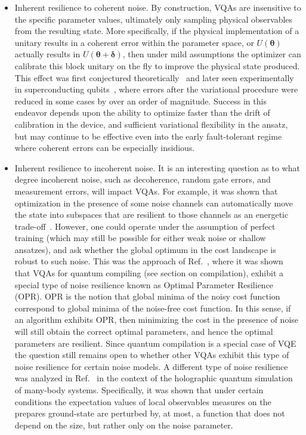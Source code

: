 \documentclass[prx,twocolumn,floatfix,superscriptaddress,longbibliography]{revtex4-1}
\renewcommand{\vec}[1]{\boldsymbol{#1}}  %
\newcommand{\<}{\langle}
\renewcommand{\>}{\rangle}
\renewcommand{\vec}[1]{\boldsymbol{#1}}  %
\begin{document}
\begin{itemize}
 \item{Inherent resilience to coherent noise.}  By construction, VQAs are insensitive to the specific parameter values, ultimately only sampling physical observables from the resulting state.  More specifically, if the physical implementation of a unitary results in a coherent error within the parameter space, or $U(\vec{\theta})$ actually results in $U(\vec{\theta} + \vec{\delta})$, then under mild assumptions the optimizer can calibrate this block unitary on the fly to improve the physical state produced.  This effect was first conjectured theoretically~\cite{mcclean2016theory} and later seen experimentally in superconducting qubits~\cite{o2016scalable}, where errors after the variational procedure were reduced in some cases by over an order of magnitude.  Success in this endeavor depends upon the ability to optimize faster than the drift of calibration in the device, and sufficient variational flexibility in the ansatz, but may continue to be effective even into the early fault-tolerant regime where coherent errors can be especially insidious.
    
\item{Inherent resilience to incoherent noise.} 
    It is an interesting question as to what degree incoherent noise, such as decoherence, random gate errors, and measurement errors, will impact VQAs. For example, it was shown that optimization in the presence of some noise channels can automatically move the state into subspaces that are resilient to those channels as an energetic trade-off~\cite{mcclean2017hybrid}.  However, one could operate under the assumption of perfect training (which may still be possible for either weak noise or shallow ansatzes), and ask whether the global optimum in the cost landscape is robust to such noise. This was the approach of Ref.~\cite{sharma2019noise}, where it was shown that VQAs for quantum compiling (see section on compilation), exhibit a special type of noise resilience known as Optimal Parameter Resilience (OPR). OPR is the notion that  global minima of the noisy cost function correspond to  global minima of the noise-free cost function. In this sense, if an algorithm exhibits OPR, then minimizing the cost in the presence of noise will still obtain the correct optimal parameters, and hence the optimal parameters are resilient. Since quantum compilation is a special case of VQE  the question still remains open to whether other VQAs exhibit this type of noise resilience for certain noise models.     A different type of noise resilience was analyzed in Ref.~\cite{kim2017noise} in the context of the holographic quantum simulation of many-body systems. Specifically, it was shown that under certain conditions the expectation values of local observables measures on the prepares ground-state are perturbed by, at most, a function that does not depend on the size, but rather only on the noise parameter. 
\end{itemize}    
\end{document}
